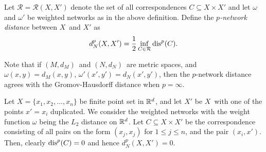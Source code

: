 	\begin{defn}
		Let $\mathcal{R}=\mathcal{R}(X,X')$ denote the set of all correspondences $C\subseteq X\times X'$ and let $\omega$ and $\omega'$ be weighted networks as in the above definition. Define the \textit{$p$-network distance} between $X$ and $X'$ as
		$$
		d_N^p(X,X')=\frac{1}{2}\inf_{C\in\mathcal{R}}\operatorname{dis}^p(C).
		$$
	\end{defn}
	Note that if $(M,d_M)$ and $(N,d_N)$ are metric spaces, and $\omega(x,y)=d_M(x,y)$, $\omega'(x',y')=d_N(x',y')$, then the $p$-network distance agrees with the Gromov-Hausdorff distance when $p=\infty$.
	
	\begin{ex}
		Let $X=\{x_1,x_2,\ldots, x_n\}$ be finite point set in $\mathbb{R}^d$, and let $X'$ be $X$ with one of the points $x'=x_i$ duplicated. We consider the weighted networks with the weight function $\omega$ being the $L_2$ distance on $\mathbb{R}^d$. Let $C\subseteq X\times X'$ be the correspondence consisting of all pairs on the form $(x_j, x_j)$ for $1\leq j\leq n$, and the pair $(x_i, x')$. Then, clearly $\operatorname{dis}^p(C)=0$ and hence $d_N^p(X,X')=0$.
	\end{ex}
	
